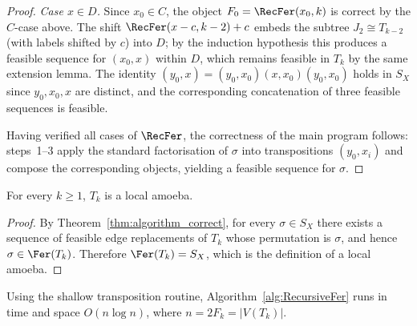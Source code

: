 \begin{proof}
    \emph{Case $x \in D$.}
    Since $x_0 \in C$, the object $F_0 = \RecFer(x_0, k)$ is correct by the $C$-case above.
    The shift $\RecFer(x-c, k-2) + c$ embeds the subtree $J_2 \cong T_{k-2}$ (with labels shifted by $c$) into $D$; by the induction hypothesis this produces a feasible sequence for $(x_0, x)$ within $D$, which remains
    feasible in $T_k$ by the same extension lemma.
    The identity $(y_0,x)=(y_0,x_0)(x,x_0)(y_0,x_0)$ holds in $S_X$ since $y_0, x_0, x$ are distinct, and the corresponding concatenation of three feasible sequences is feasible.
    
    Having verified all cases of $\RecFer$, the correctness of the main program follows: steps~1--3 apply the standard factorisation of $\sigma$ into transpositions $(y_0, x_i)$ and compose the corresponding \tFer
    objects, yielding a feasible sequence for $\sigma$.
\end{proof}

\begin{corollary}\label{cor:Tk_local_amoeba}
    For every $k\geq 1$, $T_k$ is a local amoeba.
\end{corollary}

\begin{proof}
    By Theorem~\ref{thm:algorithm_correct}, for every $\sigma\in S_X$ there exists a sequence of feasible edge replacements of $T_k$ whose permutation is $\sigma$, and hence $\sigma\in\Fer(T_k)$.
    Therefore $\Fer(T_k)=S_X$, which is the definition of a local amoeba.
\end{proof}

\begin{theorem}[Complexity]\label{thm:algorithm_complexity}
    Using the shallow transposition routine, Algorithm~\ref{alg:RecursiveFer} runs in time and space $O(n \log n)$, where $n = 2F_k = |V(T_k)|$.
\end{theorem}

